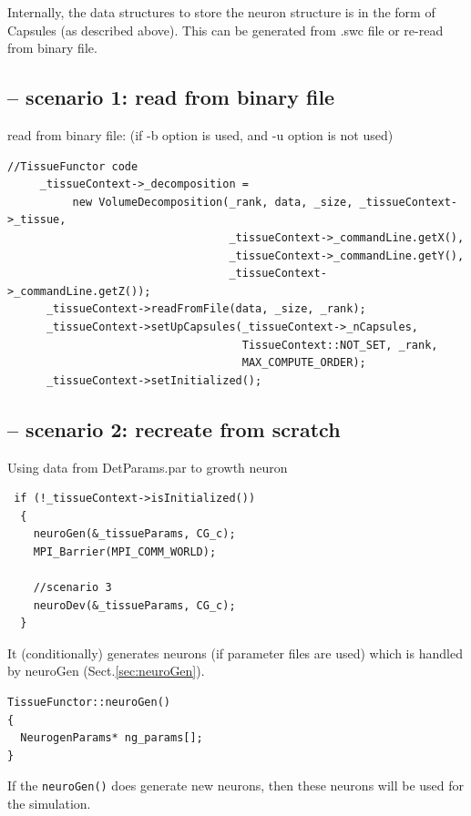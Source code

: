 Internally, the data structures to store the neuron structure is in the form of
Capsules (as described above). This can be generated from .swc file or re-read
from binary file.

\subsection{-- scenario 1: read from binary file}

read from binary file: (if -b option is used, and -u option is not used)
{\tiny
\begin{lstlisting}
//TissueFunctor code
     _tissueContext->_decomposition =
          new VolumeDecomposition(_rank, data, _size, _tissueContext->_tissue,
                                  _tissueContext->_commandLine.getX(),
                                  _tissueContext->_commandLine.getY(),
                                  _tissueContext->_commandLine.getZ());
      _tissueContext->readFromFile(data, _size, _rank);
      _tissueContext->setUpCapsules(_tissueContext->_nCapsules,
                                    TissueContext::NOT_SET, _rank,
                                    MAX_COMPUTE_ORDER);
      _tissueContext->setInitialized();

\end{lstlisting}
}

\subsection{-- scenario 2: recreate from scratch}

Using data from DetParams.par to growth neuron

\begin{lstlisting}
 if (!_tissueContext->isInitialized())
  {
    neuroGen(&_tissueParams, CG_c);
    MPI_Barrier(MPI_COMM_WORLD);
    
    //scenario 3
    neuroDev(&_tissueParams, CG_c);
  }
\end{lstlisting}

It (conditionally) generates neurons (if parameter files are
used) which is handled by neuroGen (Sect.\ref{sec:neuroGen}).
  
\begin{verbatim}
TissueFunctor::neuroGen()
{
  NeurogenParams* ng_params[];
}
\end{verbatim}

If the \verb!neuroGen()! does generate new neurons, then these neurons will be
used for the simulation.



